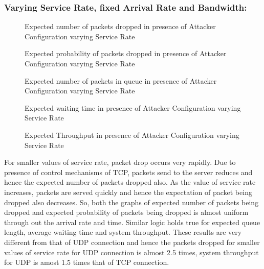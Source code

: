 \subsubsection*{Varying Service Rate, fixed Arrival Rate and Bandwidth:}

\begin{figure}[H]
		\centering
		\caption{{Expected number of packets dropped in presence of Attacker Configuration varying Service Rate}}
		\label{fig:figca1}
\end{figure}

\begin{figure}[H]
		\centering
		\caption{{Expected probability of packets dropped in presence of Attacker Configuration varying Service Rate}}
		\label{fig:figcc1}
\end{figure}

\begin{figure}[H]
		\centering
		\caption{{Expected number of packets in queue in presence of Attacker Configuration varying Service Rate}}
		\label{fig:figcd1}
\end{figure}

\begin{figure}[H]
		\centering
		\caption{{Expected waiting time in presence of Attacker Configuration varying Service Rate}}
		\label{fig:figce1}
\end{figure}

\begin{figure}[H]
		\centering
		\caption{{Expected Throughput in presence of Attacker Configuration varying Service Rate}}
		\label{fig:figcf1}
\end{figure}

For smaller values of service rate, packet drop occurs very rapidly. Due to presence of control mechanisms of TCP, packets send to the server reduces and hence the expected number of packets dropped also. As the value of service rate increases, packets are served quickly and hence the expectation of packet being dropped also decreases. So, both the graphs of expected number of packets being dropped and expected probability of packets being dropped is almost uniform through out the arrival rate and time. Similar logic holds true for expected queue length, average waiting time and system throughput. These results are very different from that of UDP connection and hence the packets dropped for smaller values of service rate for UDP connection is almost 2.5 times, system throughput for UDP is amost 1.5 times that of TCP connection.

